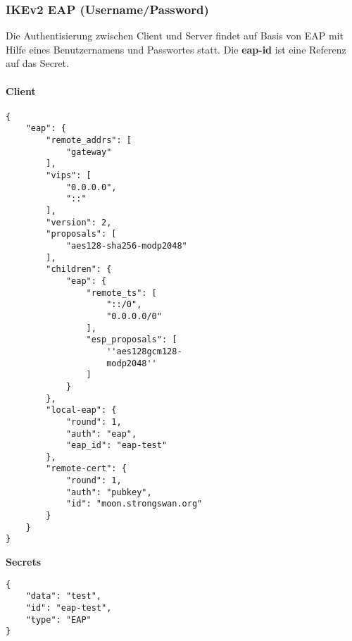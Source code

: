 \subsubsection{IKEv2 EAP (Username/Password)}
Die Authentisierung zwischen Client und Server findet auf Basis von EAP mit Hilfe eines Benutzernamens und Passwortes statt.
Die \textbf{eap-id} ist eine Referenz auf das Secret.

\noindent\begin{minipage}[t]{0.5\textwidth}
\vspace{0pt}
\paragraph{Client}\mbox{}\medskip
\begin{lstlisting}[style=BashInputStyle]
{
    "eap": {
        "remote_addrs": [
            "gateway"
        ],
        "vips": [
            "0.0.0.0",
            "::"
        ],
        "version": 2,
        "proposals": [
            "aes128-sha256-modp2048"
        ],
        "children": {
            "eap": {
                "remote_ts": [
                    "::/0",
                    "0.0.0.0/0"
                ],
                "esp_proposals": [
                    ''aes128gcm128-
                    modp2048''
                ]
            }
        },
        "local-eap": {
            "round": 1,
            "auth": "eap",
            "eap_id": "eap-test"
        },
        "remote-cert": {
            "round": 1,
            "auth": "pubkey",
            "id": "moon.strongswan.org"
        }
    }
}
\end{lstlisting}
\hspace*{18pt}\textbf{Secrets}\mbox{}\medskip
\begin{lstlisting}[style=BashInputStyle]
{
    "data": "test",
    "id": "eap-test",
    "type": "EAP"
}
\end{lstlisting}
\end{minipage}
\hfill
